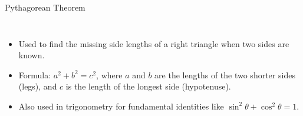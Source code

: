 \documentclass[aspectratio=169]{beamer}
\begin{document}
\begin{frame}{Pythagorean Theorem}
    \begin{tcolorbox}[colback=lightgray,colframe=primary,title=Pythagorean Theorem]
        \footnotesize
        \begin{columns}
            \begin{itemize}
                \item Used to find the missing side lengths of a right triangle when two sides are known.
                \item Formula: $a^2 + b^2 = c^2$, where $a$ and $b$ are the lengths of the two shorter sides (legs), and $c$ is the length of the longest side (hypotenuse).
                \item Also used in trigonometry for fundamental identities like $\sin^2\theta + \cos^2\theta = 1$.
            \end{itemize}
        \end{columns}
    \end{tcolorbox}
\end{frame}
\end{document}
